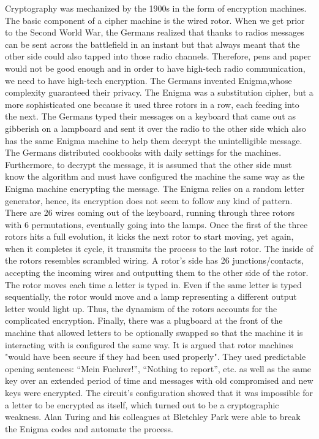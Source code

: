 Cryptography was mechanized by the 1900s in the form of encryption machines. The basic component of a cipher machine is the wired rotor.
When we get prior to the Second World War, the Germans realized that thanks to radios messages can be sent across the battlefield in an instant but that always meant that the other side could also tapped into those radio channels. Therefore, pens and paper would not be good enough and in order to have high-tech radio communication, we need to have high-tech encryption. The Germans invented Enigma,whose complexity guaranteed their privacy. The Enigma was a substitution cipher, but a more sophisticated one because it used three rotors in a row, each feeding into the next. The Germans typed their messages on a keyboard that came out as gibberish on a lampboard and sent it over the radio to the other side which also has the same Enigma machine to help them decrypt the unintelligible message. The Germans distributed cookbooks with daily settings for the machines. Furthermore, to decrypt the message, it is assumed that the other side must know the algorithm and must have configured the machine the same way as the Enigma machine encrypting the message. The Enigma relies on a random letter generator, hence, its encryption does not seem to follow any kind of pattern. There are 26 wires coming out of the keyboard, running through three rotors with 6 permutations, eventually going into the lamps. Once the first of the three rotors hits a full evolution, it kicks the next rotor to start moving, yet again, when it completes it cycle, it transmits the process to the last rotor. The inside of the rotors resembles scrambled wiring. A rotor's side has 26 junctions/contacts,  accepting the incoming wires and outputting them to the other side of the rotor. The rotor moves each time a letter is typed in. Even if the same letter is typed sequentially, the rotor would move and a lamp representing a different output letter would light up. Thus, the dynamism of the rotors accounts for the complicated encryption. Finally, there was a plugboard at the front of the machine that allowed letters to be optionally swapped so that the machine it is interacting with is configured the same way.
It is argued that rotor machines "would have been secure if they had been used properly". They used predictable opening sentences: “Mein Fuehrer!”, “Nothing to report”, etc. as well as the same key over an extended period of time and messages with old compromised and new keys were encrypted. The circuit’s configuration showed that it was impossible for a letter to be encrypted as itself, which turned out to be a cryptographic weakness. Alan Turing and his colleagues at Bletchley Park were able to break the Enigma codes and automate the process. 


